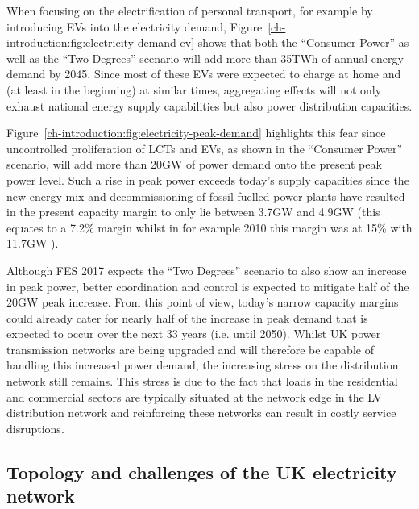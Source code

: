 

When focusing on the electrification of personal transport, for example by introducing EVs into the electricity demand, Figure~\ref{ch-introduction:fig:electricity-demand-ev} shows that both the ``Consumer Power'' as well as the ``Two Degrees'' scenario will add more than 35TWh of annual energy demand by 2045.
Since most of these EVs were expected to charge at home and (at least in the beginning) at similar times, aggregating effects will not only exhaust national energy supply capabilities but also power distribution capacities.




Figure~\ref{ch-introduction:fig:electricity-peak-demand} highlights this fear since uncontrolled proliferation of LCTs and EVs, as shown in the ``Consumer Power'' scenario, will add more than 20GW of power demand onto the present peak power level.
Such a rise in peak power exceeds today's supply capacities since the new energy mix and decommissioning of fossil fuelled power plants have resulted in the present capacity margin to only lie between 3.7GW and 4.9GW \cite{NationalGrid2017a} (this equates to a 7.2\% margin whilst in for example 2010 this margin was at 15\% with 11.7GW \cite{NationalGrid2010}).

Although FES 2017 expects the ``Two Degrees'' scenario to also show an increase in peak power, better coordination and control is expected to mitigate half of the 20GW peak increase.
From this point of view, today's narrow capacity margins could already cater for nearly half of the increase in peak demand that is expected to occur over the next 33 years (i.e. until 2050).
Whilst UK power transmission networks are being upgraded and will therefore be capable of handling this increased power demand, the increasing stress on the distribution network still remains.
This stress is due to the fact that loads in the residential and commercial sectors are typically situated at the network edge in the LV distribution network and reinforcing these networks can result in costly service disruptions.

\subsection{Topology and challenges of the UK electricity network}
\label{ch-introduction:subsec:topology-of-lv-network}

